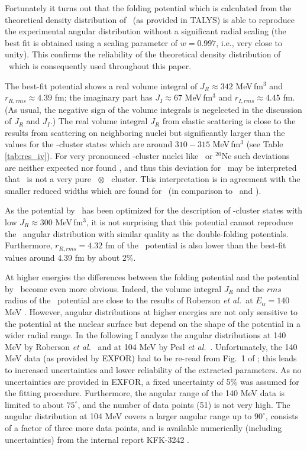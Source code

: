 Fortunately it turns out that the folding potential which is calculated from
the theoretical density distribution of \tinull\ (as provided in TALYS) is
able to reproduce the experimental angular distribution without a significant
radial scaling (the best fit is obtained using a scaling parameter of $w =
0.997$, i.e., very close to unity). This confirms the reliability of the
theoretical density distribution of \tinull\ which is consequently used
throughout this paper.

The best-fit potential shows a real volume integral of $J_R \approx 342$
MeV\,fm$^3$ and $r_{R,rms} \approx 4.39$ fm; the imaginary part has $J_I
\approx 67$ MeV\,fm$^3$ and $r_{I,rms} \approx 4.45$ fm. (As usual, the
negative sign of the volume integrals is negelected in the discussion of $J_R$
and $J_I$.) The real volume integral $J_R$ from elastic scattering is close to
the results from scattering on neighboring nuclei \cite{Atz96} but
significantly larger than the values for the \al -cluster states which are
around $310 - 315$ MeV\,fm$^3$ (see Table \ref{tab:res_iv}). For very
pronounced \al -cluster nuclei like \tiiv\ or $^{20}$Ne such deviations are
neither expected nor found \cite{Atz96,Abe93}, and thus this deviation for
\criv\ may be interpreted that \criv\ is not a very pure \tinull\ $\otimes$
\al\ cluster. This interpretation is in agreement with the smaller reduced
widths which are found for \criv\ (in comparison to \crvi\ and \tiiv ).

As the potential by \SM\ has been optimized for the description of \al
-cluster states with low $J_R \approx 300$ MeV\,fm$^3$, it is not surprising
that this potential cannot reproduce the \tinull \raa \tinull\ angular
distribution with similar quality as the double-folding
potentials. Furthermore, $r_{R,rms} = 4.32$ fm of the \SM\ potential is also
lower than the best-fit values around 4.39 fm by about 2\%. 

At higher energies the differences between the folding potential and the
potential by \SM\ become even more obvious. Indeed, the volume integral $J_R$
and the $rms$ radius of the \SM\ potential are close to the results of
Roberson {\it et al.}\ at $E_\alpha = 140$ MeV \cite{Rob78}. However, angular
distributions at higher energies are not only sensitive to the potential at
the nuclear surface but depend on the shape of the potential in a wider radial
range. In the following I analyze the angular distributions at 140 MeV by
Roberson {\it et al.}\ \cite{Rob78} and at 104 MeV by Pesl {\it et
  al.}\ \cite{Pesl83}. Unfortunately, the 140 MeV data (as provided by EXFOR)
had to be re-read from Fig.~1 of \cite{Rob78}; this leads to increased
uncertainties and lower reliability of the extracted parameters. As no
uncertainties are provided in EXFOR, a fixed uncertainty of 5\% was assumed
for the fitting procedure. Furthermore, the angular range of the 140 MeV data
is limited to about $75^\circ$, and the number of data points (51) is not very
high. The angular distribution at 104 MeV \cite{Pesl83} covers a larger
angular range up to $90^\circ$, consists of a factor of three more data
points, and is available numerically (including uncertainties) from the
internal report KFK-3242 \cite{Pesl82}.

